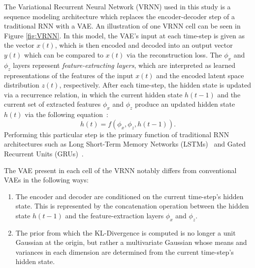 \documentclass[11pt, a4paper]{article}
\begin{document}
The Variational Recurrent Neural Network (VRNN) used in this study is a sequence modeling architecture
which replaces the encoder-decoder step of a traditional RNN with a VAE. 
An illustration of one VRNN cell can be seen
in Figure \ref{fig:VRNN}. 
In this model, the VAE's input at each time-step is given as the vector $x(t)$, which is then encoded and decoded into an output vector $y(t)$ which can be compared to $x(t)$ via the reconstruction loss.
The $\phi_{x}$ and $\phi_{z}$ layers represent \textit{feature-extracting layers}, which are interpreted as learned representations of the features of the input $x(t)$ and the encoded latent space distribution $z(t)$, respectively. 
After each time-step, the hidden state is updated via a recurrence relation, in which the current hidden state $h(t-1)$ and the current set of extracted features $\phi_{x}$ and $\phi_{z}$ produce an updated hidden state $h(t)$ via the following equation~\cite{chung2016recurrent}:
\begin{equation}
	h(t) = f(\phi_{x}, \phi_{z}, h(t-1)).
\end{equation} 
Performing this particular step is the primary function of traditional RNN architectures such as Long Short-Term Memory Networks (LSTMs)~\cite{lstm} and Gated Recurrent Units (GRUs)~\cite{cho2014learning}. %

The VAE present in each cell of the VRNN notably differs from
conventional VAEs in the following ways:
\begin{enumerate}
  \item{The encoder and decoder are conditioned on the current time-step's hidden state.
  This is represented by the concatenation operation between the hidden state $h(t-1)$ and the feature-extraction layers $\phi_{x}$ and $\phi_{z}$.}
  \item{The prior from which the KL-Divergence is computed is no longer a unit Gaussian
  at the origin, but rather a multivariate Gaussian whose means and variances in each 
  dimension are determined from the current time-step's hidden state.}
\end{enumerate}
\end{document}
